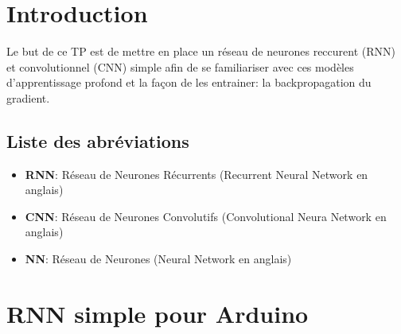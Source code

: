 \documentclass[a4paper, 12pt, openany]{book}
\makeatletter
\renewcommand\mainmatter{%
  \setlength{\parskip}{0pt}
  \pagenumbering{arabic}
  \pagestyle{empty}
  \@mainmattertrue}
\makeatother
\begin{document}
\tableofcontents 

\clearpage %

\frontmatter

\chapter{Introduction}
Le but de ce TP est de mettre en place un réseau de neurones reccurent (RNN) et convolutionnel (CNN) simple afin de se familiariser avec ces modèles d'apprentissage profond
et la façon de les entrainer: la backpropagation du gradient.

\section{Liste des abréviations} %
\begin{itemize}
  \item \textbf{RNN}: Réseau de Neurones Récurrents (Recurrent Neural Network en anglais)
  \item \textbf{CNN}: Réseau de Neurones Convolutifs (Convolutional Neura Network en anglais)
  \item \textbf{NN}: Réseau de Neurones (Neural Network en anglais)
\end{itemize}



\mainmatter
\chapter{RNN simple pour Arduino}
\end{document}
